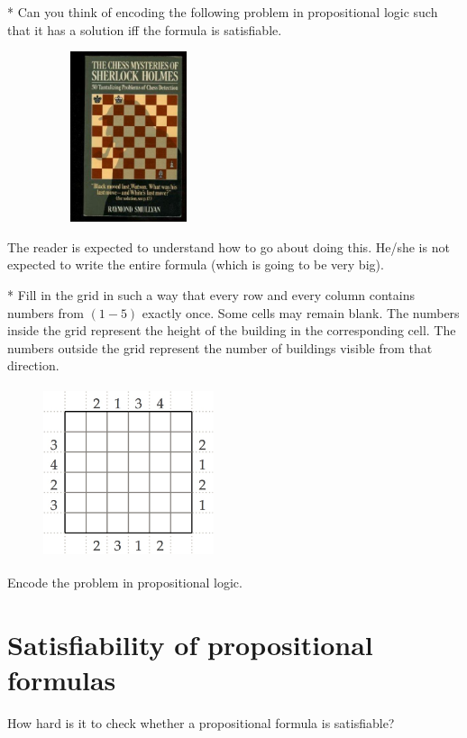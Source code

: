 \begin{exercise}[Smullyan]*
Can you think of encoding the following problem in propositional logic such that it has a solution iff the formula is satisfiable.
\begin{figure}[H]
\centering
\includegraphics[width=5cm, height=5cm]{chess.jpg}
\end{figure}
The reader is expected to understand how to go about doing this. He/she is not expected to write the entire formula (which is going to be very big).
\end{exercise}

\begin{exercise}*
Fill in the grid in such a way that every row and every column contains numbers from $(1-5)$ exactly once. Some cells may remain blank. The numbers inside the grid represent the height of
the building in the corresponding cell. The numbers outside the grid represent the number of buildings visible from that direction.
\begin{figure}[H]
\centering
\includegraphics[width=5cm,height=5cm]{skyscrapper.jpg}
\end{figure}

Encode the problem in propositional logic.
\end{exercise}

\section{Satisfiability of propositional formulas}
How hard is it to check whether a propositional formula is satisfiable?  

